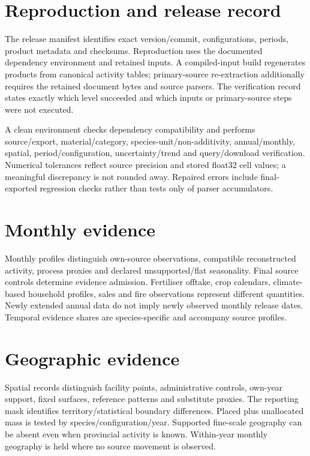 \section{Reproduction and release record}\label{app:repro}
The release manifest identifies exact version/commit, configurations, periods, product metadata and checksums. Reproduction uses the documented dependency environment and retained inputs. A compiled-input build regenerates products from canonical activity tables; primary-source re-extraction additionally requires the retained document bytes and source parsers. The verification record states exactly which level succeeded and which inputs or primary-source steps were not executed.

A clean environment checks dependency compatibility and performs source/export, material/category, species-unit/non-additivity, annual/monthly, spatial, period/configuration, uncertainty/trend and query/download verification. Numerical tolerances reflect source precision and stored float32 cell values; a meaningful discrepancy is not rounded away. Repaired errors include final-exported regression checks rather than tests only of parser accumulators.

\section{Monthly evidence}\label{app:monthly}
Monthly profiles distinguish own-source observations, compatible reconstructed activity, process proxies and declared unsupported/flat seasonality. Final source controls determine evidence admission. Fertiliser offtake, crop calendars, climate-based household profiles, sales and fire observations represent different quantities. Newly extended annual data do not imply newly observed monthly release dates. Temporal evidence shares are species-specific and accompany source profiles.

\section{Geographic evidence}\label{app:spatial}
Spatial records distinguish facility points, administrative controls, own-year support, fixed surfaces, reference patterns and substitute proxies. The reporting mask identifies territory/statistical boundary differences. Placed plus unallocated mass is tested by species/configuration/year. Supported fine-scale geography can be absent even when provincial activity is known. Within-year monthly geography is held where no source movement is observed.

